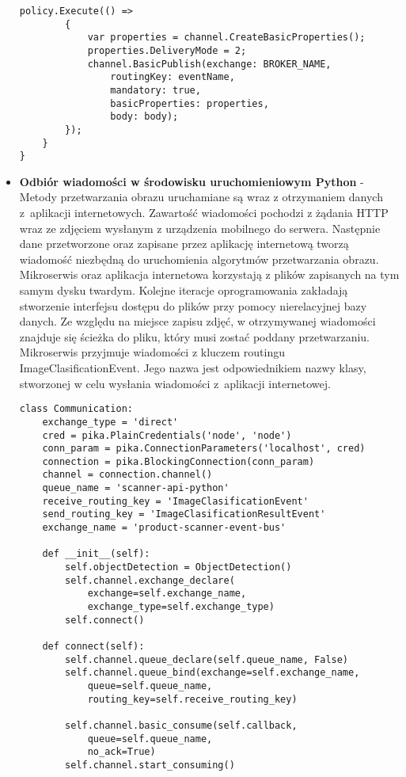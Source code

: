 \begin{itemize}
\begin{lstlisting}[caption={Metoda publikacji wiadomości.}, label={messagePublish}]
		policy.Execute(() =>
		{
			var properties = channel.CreateBasicProperties();
			properties.DeliveryMode = 2;	
			channel.BasicPublish(exchange: BROKER_NAME,
				routingKey: eventName,
				mandatory: true,
				basicProperties: properties,
				body: body);
		});
	}
}
\end{lstlisting}
\item \textbf{Odbiór wiadomości w środowisku uruchomieniowym Python} - Metody przetwarzania obrazu uruchamiane są wraz z otrzymaniem danych z~aplikacji internetowych. Zawartość wiadomości pochodzi z żądania HTTP wraz ze zdjęciem wysłanym z urządzenia mobilnego do serwera. Następnie dane przetworzone oraz zapisane przez aplikację internetową tworzą wiadomość niezbędną do uruchomienia algorytmów przetwarzania obrazu. Mikroserwis oraz aplikacja internetowa korzystają z plików zapisanych na tym samym dysku twardym. Kolejne iteracje oprogramowania zakładają stworzenie interfejsu dostępu do plików przy pomocy nierelacyjnej bazy danych. Ze względu na miejsce zapisu zdjęć, w otrzymywanej wiadomości znajduje się ścieżka do pliku, który musi zostać poddany przetwarzaniu. Mikroserwis przyjmuje wiadomości z kluczem routingu ImageClasificationEvent. Jego nazwa jest odpowiednikiem nazwy klasy, stworzonej w celu wysłania wiadomości z~aplikacji internetowej. 

\begin{lstlisting}[caption={Połączenie do kolejki RabbitMQ.}]
class Communication:
	exchange_type = 'direct'
	cred = pika.PlainCredentials('node', 'node')
	conn_param = pika.ConnectionParameters('localhost', cred)
	connection = pika.BlockingConnection(conn_param)
	channel = connection.channel()
	queue_name = 'scanner-api-python'
	receive_routing_key = 'ImageClasificationEvent'
	send_routing_key = 'ImageClasificationResultEvent'
	exchange_name = 'product-scanner-event-bus'
	
	def __init__(self):
		self.objectDetection = ObjectDetection()
		self.channel.exchange_declare(
			exchange=self.exchange_name,
			exchange_type=self.exchange_type)
		self.connect()
	
	def connect(self):
		self.channel.queue_declare(self.queue_name, False)
		self.channel.queue_bind(exchange=self.exchange_name,
			queue=self.queue_name,
			routing_key=self.receive_routing_key)
		
		self.channel.basic_consume(self.callback,
			queue=self.queue_name,
			no_ack=True)
		self.channel.start_consuming()
\end{lstlisting}


\end{itemize}

